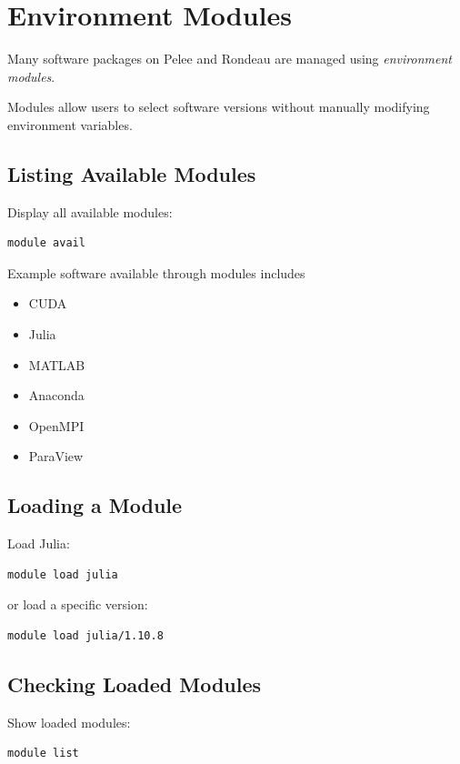 \section{Environment Modules}

Many software packages on Pelee and Rondeau are managed using
\emph{environment modules}.

Modules allow users to select software versions without manually modifying environment variables.

\subsection{Listing Available Modules}

Display all available modules:

\begin{lstlisting}
module avail
\end{lstlisting}

Example software available through modules includes

\begin{itemize}
\item CUDA
\item Julia
\item MATLAB
\item Anaconda
\item OpenMPI
\item ParaView
\end{itemize}

\subsection{Loading a Module}

Load Julia:

\begin{lstlisting}
module load julia
\end{lstlisting}

or load a specific version:

\begin{lstlisting}
module load julia/1.10.8
\end{lstlisting}

\subsection{Checking Loaded Modules}

Show loaded modules:

\begin{lstlisting}
module list
\end{lstlisting}

